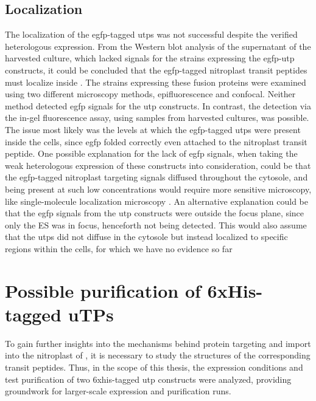 \subsection{Localization}
The localization of the \gls{egfp}-tagged \gls{utp}s was not successful despite the verified heterologous expression. From the Western blot analysis of the supernatant of the harvested culture, which lacked signals for the strains expressing the \gls{egfp}-\gls{utp} constructs, it could be concluded that the \gls{egfp}-tagged nitroplast transit peptides must localize inside . The strains expressing these fusion proteins were examined using two different microscopy methods, epifluorescence and confocal. Neither method detected \gls{egfp} signals for the \gls{utp} constructs. In contrast, the detection via the in-gel fluorescence assay, using samples from harvested cultures, was possible. The issue most likely was the levels at which the \gls{egfp}-tagged \gls{utp}s were present inside the cells, since \gls{egfp} folded correctly even attached to the nitroplast transit peptide. One possible explanation for the lack of \gls{egfp} signals, when taking the weak heterologous expression of these constructs into consideration, could be that the \gls{egfp}-tagged nitroplast targeting signals diffused throughout the cytosole, and being present at such low concentrations would require more sensitive microscopy, like single-molecule localization microscopy \parencite{lelek_single-molecule_2021}. An alternative explanation could be that the \gls{egfp} signals from the \gls{utp} constructs were outside the focus plane, since only the \gls{ES} was in focus, henceforth not being detected. This would also assume that the \gls{utp}s did not diffuse in the cytosole but instead localized to specific regions within the cells, for which we have no evidence so far
\section{Possible purification of 6xHis-tagged uTPs}
To gain further insights into the mechanisms behind protein targeting and import into the nitroplast of , it is necessary to study the structures of the corresponding transit peptides. Thus, in the scope of this thesis, the expression conditions and test purification of two \gls{6xhis}-tagged \gls{utp} constructs were analyzed, providing groundwork for larger-scale expression and purification runs.  
